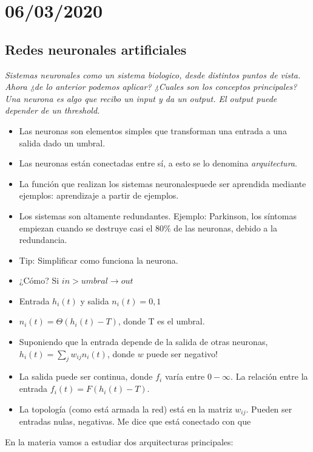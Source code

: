 \section{06/03/2020}

\subsection{Redes neuronales artificiales}

{\sl Sistemas neuronales como un sistema biologico, desde distintos puntos de vista. Ahora ¿de lo anterior podemos aplicar? ¿Cuales son los conceptos principales? Una neurona es algo que recibo un input y da un output. El output puede depender de un threshold. 
}
\begin{itemize}
	\item Las neuronas son elementos simples que transforman una entrada a una salida dado un umbral.
	\item Las neuronas están conectadas entre sí, a esto se lo denomina {\sl arquitectura}.
	\item La función que realizan los sistemas neuronalespuede ser aprendida mediante ejemplos: aprendizaje a partir de ejemplos.
	\item Los sistemas son altamente redundantes. Ejemplo: Parkinson, los síntomas empiezan cuando se destruye casi el 80\% de las neuronas, debido a la redundancia.
	\item Tip: Simplificar como funciona la neurona.
	\item ¿Cómo? Si $in>umbral \rightarrow out$
	\item Entrada $h_i(t)$ y salida $n_i(t)={0,1}$
	\item $n_i(t) = \Theta(h_i(t) - T)$, donde T es el umbral.
	\item Suponiendo que la entrada depende de la salida de otras neuronas, $h_i(t) = \sum_j w_{ij}n_i(t)$, donde $w$ puede ser negativo!
	\item La salida puede ser continua, donde $f_i$ varía entre $0-\infty$. La relación entre la entrada $f_i(t) = F(h_i(t)-T)$.
	\item La topología (como está armada la red) está en la matriz $w_{ij}$. Pueden ser entradas nulas, negativas. Me dice que está conectado con que
\end{itemize}

En la materia vamos a estudiar dos arquitecturas principales:

